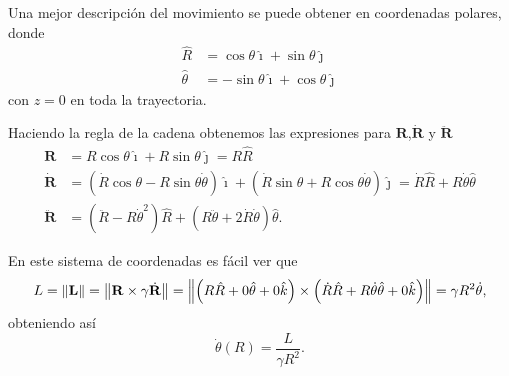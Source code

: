 Una mejor descripción del movimiento se puede obtener en coordenadas polares, donde
\begin{align}
 \hat{R} &= \cos \theta \hat{\imath} + \sin \theta \hat{\jmath} \nonumber \\
 \hat{\theta} &= -\sin \theta \hat{\imath} + \cos \theta \hat{\jmath}
 \label{eq:polar_transformation}
\end{align}
con $z=0$ en toda la trayectoria. 

Haciendo la regla de la cadena obtenemos las expresiones para  $\mathbf{R}$,$\dot{\mathbf{R}}$ y $\ddot{\mathbf{R}}$
\begin{align}
 \mathbf{R} &= R \cos \theta \hat{\imath} + R \sin \theta \hat{\jmath} = R \hat{R} \\
 \dot{\mathbf{R}} &= \left( \dot{R} \cos \theta - R \sin \theta \dot{\theta} \right) \hat{\imath} + \left( \dot{R} \sin \theta + R \cos \theta \dot{\theta} \right) \hat{\jmath} = \dot{R}\hat{R} + R \dot{\theta} \hat{\theta} \\
 \ddot{\mathbf{R}} &= \left(\ddot{R} - R \dot{\theta}^2 \right) \hat{R} + \left( R \ddot{\theta} + 2 \dot{R}\dot{\theta} \right) \hat{\theta}.
 \label{eq:motion_polar_variables}
\end{align}

En este sistema de coordenadas es fácil ver que
\begin{equation}
 L = \left\lVert \mathbf{L} \right\rVert = \left\lVert \mathbf{R} \times \gamma \dot{\mathbf{R}} \right\rVert = \left\lVert \left( R \hat{R} + 0 \hat{\theta} + 0 \hat{k} \right) \times \left( \dot{R} \hat{R} + R \dot{\theta} \hat{\theta} + 0\hat{k} \right) \right\rVert = \gamma R^2 \dot{\theta},
\end{equation}
obteniendo así
\begin{equation}
\dot{\theta}(R) = \frac{L}{\gamma R^2}.
\label{eq:2body_ang_vel}
\end{equation}

